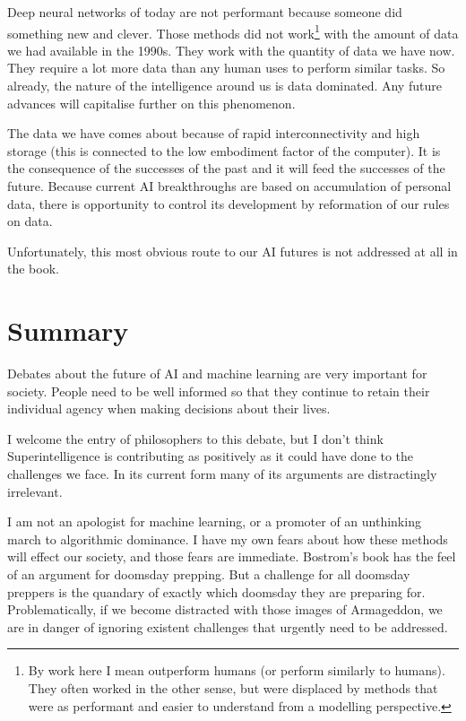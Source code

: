 \documentclass[a4paper]{caesar_book}
\begin{document}
Deep neural networks of today are not performant because someone did something new and clever. Those methods did not work\footnote{By work here I mean outperform humans (or perform similarly to humans). They often worked in the other sense, but were displaced by methods that were as performant and easier to understand from a modelling perspective.} with the amount of data we had available in the 1990s. They work with the quantity of data we have now. They require a lot more data than any human uses to perform similar tasks. So already, the nature of the intelligence around us is data dominated. Any future advances will capitalise further on this phenomenon.

The data we have comes about because of rapid interconnectivity and high storage (this is connected to the low embodiment factor of the computer). It is the consequence of the successes of the past and it will feed the successes of the future. Because current AI breakthroughs are based on accumulation of personal data, there is opportunity to control its development by reformation of our rules on data.

Unfortunately, this most obvious route to our AI futures is not addressed at all in the book.

\section{Summary}

Debates about the future of AI and machine learning are very important for society. People need to be well informed so that they continue to retain their individual agency when making decisions about their lives.

I welcome the entry of philosophers to this debate, but I don’t think Superintelligence is contributing as positively as it could have done to the challenges we face. In its current form many of its arguments are distractingly irrelevant.

I am not an apologist for machine learning, or a promoter of an unthinking march to algorithmic dominance. I have my own fears about how these methods will effect our society, and those fears are immediate. Bostrom’s book has the feel of an argument for doomsday prepping. But a challenge for all doomsday preppers is the quandary of exactly which doomsday they are preparing for. Problematically, if we become distracted with those images of Armageddon, we are in danger of ignoring existent challenges that urgently need to be addressed.
\end{document}
